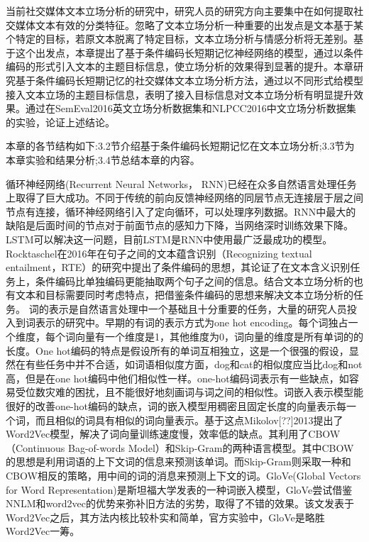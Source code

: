 

当前社交媒体文本立场分析的研究中，研究人员的研究方向主要集中在如何提取社交媒体文本有效的分类特征。忽略了文本立场分析一种重要的出发点是文本基于某个特定的目标，若原文本脱离了特定目标，文本立场分析与情感分析将无差别。基于这个出发点，本章提出了基于条件编码长短期记忆神经网络的模型，通过以条件编码的形式引入文本的主题目标信息，使立场分析的效果得到显著的提升。本章研究基于条件编码长短期记忆的社交媒体文本立场分析方法，通过以不同形式给模型接入文本立场的主题目标信息，表明了接入目标信息对文本立场分析有明显提升效果。通过在SemEval2016英文立场分析数据集和NLPCC2016中文立场分析数据集的实验，论证上述结论。

本章的各节结构如下:3.2节介绍基于条件编码长短期记忆在文本立场分析;3.3节为本章实验和结果分析;3.4节总结本章的内容。

循环神经网络(Recurrent Neural Networks， RNN)已经在众多自然语言处理任务上取得了巨大成功。不同于传统的前向反馈神经网络的同层节点无连接层于层之间节点有连接，循环神经网络引入了定向循环，可以处理序列数据。RNN中最大的缺陷是后面时间的节点对于前面节点的感知力下降，当网络深时训练效果下降。LSTM可以解决这一问题，目前LSTM是RNN中使用最广泛最成功的模型。Rocktaschel\cite{rocktaschel2015reasoning}在2016年在句子之间的文本蕴含识别（Recognizing textual entailment，RTE）的研究中提出了条件编码的思想，其论证了在文本含义识别任务上，条件编码比单独编码更能抽取两个句子之间的信息。结合文本立场分析的也有文本和目标需要同时考虑特点，把借鉴条件编码的思想来解决文本立场分析的任务。
词的表示是自然语言处理中一个基础且十分重要的任务，大量的研究人员投入到词表示的研究中。早期的有词的表示方式为one hot encoding。每个词独占一个维度，每个词向量有一个维度是1，其他维度为0，词向量的维度是所有单词的的长度。One hot编码的特点是假设所有的单词互相独立，这是一个很强的假设，显然在有些任务中并不合适，如词语相似度方面，dog和cat的相似度应当比dog和not高，但是在one hot编码中他们相似性一样。one-hot编码词表示有一些缺点，如容易受位数灾难的困扰，且不能很好地刻画词与词之间的相似性。词嵌入表示模型能很好的改善one-hot编码的缺点，词的嵌入模型用稠密且固定长度的向量表示每一个词，而且相似的词具有相似的词向量表示。基于这点Mikolov[??]2013提出了Word2Vec模型，解决了词向量训练速度慢，效率低的缺点。其利用了CBOW（Continuous Bag-of-words Model）和Skip-Gram的两种语言模型。其中CBOW的思想是利用词语的上下文词的信息来预测该单词。而Skip-Gram则采取一种和CBOW相反的策略，用中间的词的消息来预测上下文的词。GloVe(Global Vectors for Word Representation)是斯坦福大学发表的一种词嵌入模型，GloVe尝试借鉴NNLM和word2vec的优势来弥补旧方法的劣势，取得了不错的效果。该文发表于Word2Vec之后，其方法内核比较朴实和简单，官方实验中，GloVe是略胜Word2Vec一筹。

